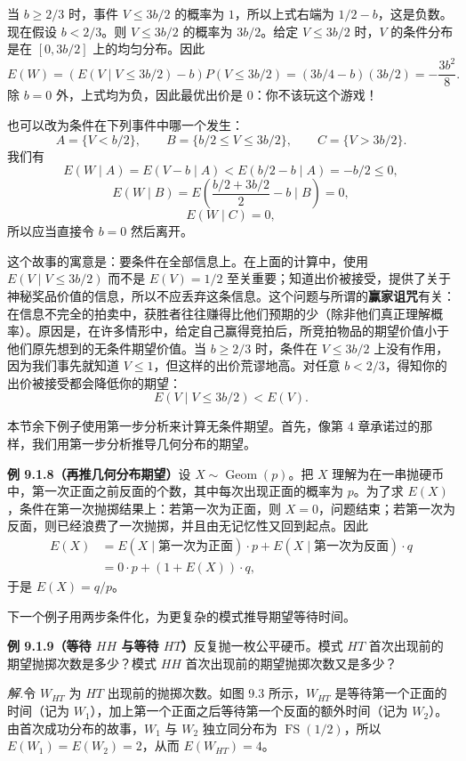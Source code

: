 \documentclass[UTF8, 12pt, fontset=fandol, oneside]{ctexart}
\begin{document}
当 $b\ge 2/3$ 时，事件 $V\le 3b/2$ 的概率为 $1$，所以上式右端为 $1/2-b$，这是负数。现在假设 $b<2/3$。则 $V\le 3b/2$ 的概率为 $3b/2$。给定 $V\le 3b/2$ 时，$V$ 的条件分布是在 $[0,3b/2]$ 上的均匀分布。因此
\[
  E(W)=\left(E(V\mid V\le 3b/2)-b\right)P(V\le 3b/2)
  =(3b/4-b)(3b/2)=-\frac{3b^2}{8}.
\]
除 $b=0$ 外，上式均为负，因此最优出价是 $0$：你不该玩这个游戏！

也可以改为条件在下列事件中哪一个发生：
\[
  A=\{V<b/2\},\qquad B=\{b/2\le V\le 3b/2\},\qquad C=\{V>3b/2\}.
\]
我们有
\[
  E(W\mid A)=E(V-b\mid A)<E(b/2-b\mid A)=-b/2\le0,
\]
\[
  E(W\mid B)=E\left(\frac{b/2+3b/2}{2}-b\mid B\right)=0,
\]
\[
  E(W\mid C)=0,
\]
所以应当直接令 $b=0$ 然后离开。

这个故事的寓意是：要条件在全部信息上。在上面的计算中，使用 $E(V\mid V\le 3b/2)$ 而不是 $E(V)=1/2$ 至关重要；知道出价被接受，提供了关于神秘奖品价值的信息，所以不应丢弃这条信息。这个问题与所谓的\textbf{赢家诅咒}有关：在信息不完全的拍卖中，获胜者往往赚得比他们预期的少（除非他们真正理解概率）。原因是，在许多情形中，给定自己赢得竞拍后，所竞拍物品的期望价值小于他们原先想到的无条件期望价值。当 $b\ge 2/3$ 时，条件在 $V\le 3b/2$ 上没有作用，因为我们事先就知道 $V\le1$，但这样的出价荒谬地高。对任意 $b<2/3$，得知你的出价被接受都会降低你的期望：
\[
  E(V\mid V\le 3b/2)<E(V).
\]

本节余下例子使用第一步分析来计算无条件期望。首先，像第 4 章承诺过的那样，我们用第一步分析推导几何分布的期望。

\noindent\textbf{例 9.1.8（再推几何分布期望）}\quad 设 $X\sim\operatorname{Geom}(p)$。把 $X$ 理解为在一串抛硬币中，第一次正面之前反面的个数，其中每次出现正面的概率为 $p$。为了求 $E(X)$，条件在第一次抛掷结果上：若第一次为正面，则 $X=0$，问题结束；若第一次为反面，则已经浪费了一次抛掷，并且由无记忆性又回到起点。因此
\[
\begin{aligned}
  E(X)
  &=E(X\mid \text{第一次为正面})\cdot p
    +E(X\mid \text{第一次为反面})\cdot q\\
  &=0\cdot p+(1+E(X))\cdot q,
\end{aligned}
\]
于是 $E(X)=q/p$。

下一个例子用两步条件化，为更复杂的模式推导期望等待时间。

\noindent\textbf{例 9.1.9（等待 $HH$ 与等待 $HT$）}\quad 反复抛一枚公平硬币。模式 $HT$ 首次出现前的期望抛掷次数是多少？模式 $HH$ 首次出现前的期望抛掷次数又是多少？

\noindent\textit{解.}\quad 令 $W_{HT}$ 为 $HT$ 出现前的抛掷次数。如图 9.3 所示，$W_{HT}$ 是等待第一个正面的时间（记为 $W_1$），加上第一个正面之后等待第一个反面的额外时间（记为 $W_2$）。由首次成功分布的故事，$W_1$ 与 $W_2$ 独立同分布为 $\operatorname{FS}(1/2)$，所以 $E(W_1)=E(W_2)=2$，从而 $E(W_{HT})=4$。
\end{document}
